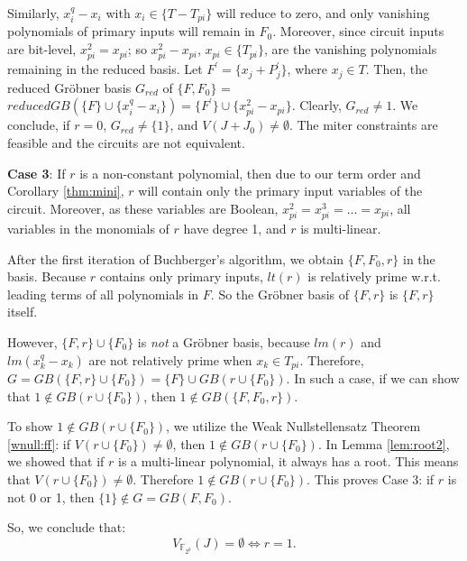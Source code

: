 \begin{Proof}
Similarly, $x_i^{q}-x_i$ with $x_i\in \{T-T_{pi}\}$
will reduce to zero, and only vanishing polynomials of primary inputs
will remain in $F_0$. Moreover, since circuit inputs are bit-level,
$x_{pi}^2 = x_{pi}$; so $x_{pi}^{2}-x_{pi}$, $x_{pi}\in \{T_{pi}\}$,
are the vanishing polynomials remaining in the reduced basis. Let
$F^{'}=\{x_j+P_j^{'}\}$, where $x_j \in T$. Then, the reduced
Gr\"obner basis $G_{red}$ of $\{F, F_0\}$ = $reducedGB(\{F\} \cup
\{x_i^{q}-x_i\})=\{F^{'}\} \cup \{x_{pi}^{2}-x_{pi}\}$. Clearly,
$G_{red} \neq 1$. We conclude, if $r=0$, $G_{red} \neq \{1\}$, and
$V(J + J_0) \neq \emptyset$. The miter constraints are feasible and the
circuits are not equivalent. 


{\bf Case 3}: If $r$ is a non-constant polynomial, then due to our
term order and Corollary \ref{thm:mini}, $r$ will contain only the
primary input variables of the circuit. Moreover, as these variables
are Boolean, $x_{pi}^2 = x_{pi}^3 = \dots = x_{pi}$, all variables in
the monomials of $r$ have degree 1, and $r$ is multi-linear.





After the first iteration of Buchberger's algorithm, we obtain $\{F,
F_0, r\}$ in the basis. Because $r$ contains only primary inputs,
$lt(r)$ is relatively prime w.r.t. leading terms of all polynomials in
$F$. So the Gr\"obner basis of $\{F,r\}$ is $\{F,r\}$ itself.

However, $\{F,r\}\cup \{F_{0}\}$ is {\it not} a Gr\"obner basis,
because $lm(r)$ and $lm(x_k^{q}-x_k)$ are not relatively prime when
$x_k\in T_{pi}$.  Therefore, $G = GB(\{F,r\}\cup
\{F_{0}\}) = \{F\} \cup GB(r\cup \{F_{0}\})$. In such a
case, if we can show that $1 \notin GB(r\cup \{F_{0}\})$, then
$1\notin GB(\{F,F_{0},r\})$. 

To show $1 \notin GB(r\cup \{F_{0}\})$, we utilize the Weak
Nullstellensatz Theorem \ref{wnull:ff}: if $V(r\cup \{F_{0}\})\neq
\emptyset$,  then $1 \notin GB(r\cup \{F_{0}\})$. In Lemma
\ref{lem:root2}, we showed that if $r$ is a multi-linear  
polynomial, it always has a root. This means that $V(r\cup
\{F_{0}\})\neq \emptyset$.  Therefore $1 \notin GB(r\cup
\{F_{0}\})$. This proves Case 3: if $r$ is not 0 or 1, then $\{1\}
\notin G = GB(F,F_0)$.  

So, we conclude that:
\begin{equation}
	V_{\mathbb{F}_{2^k}}(J)=\emptyset \iff r=1.
\end{equation}
\end{Proof}

